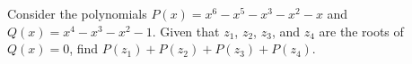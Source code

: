 Consider the polynomials $P(x)=x^{6}-x^{5}-x^{3}-x^{2}-x$ and $Q(x)=x^{4}-x^{3}-x^{2}-1$. Given that $z_{1}$, $z_{2}$, $z_{3}$, and $z_{4}$ are the roots of $Q(x)=0$, find $P(z_{1})+P(z_{2})+P(z_{3})+P(z_{4})$. 